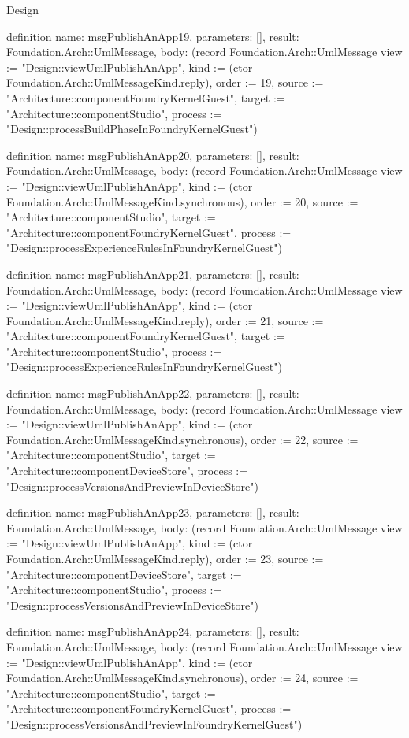 \begin{lexlean}{Design}
\begin{semanticmodule}
definition{
  name: msgPublishAnApp19,
  parameters: [],
  result: Foundation.Arch::UmlMessage,
  body: (record Foundation.Arch::UmlMessage {view := "Design::viewUmlPublishAnApp", kind := (ctor Foundation.Arch::UmlMessageKind.reply), order := 19, source := "Architecture::componentFoundryKernelGuest", target := "Architecture::componentStudio", process := "Design::processBuildPhaseInFoundryKernelGuest"})
}

definition{
  name: msgPublishAnApp20,
  parameters: [],
  result: Foundation.Arch::UmlMessage,
  body: (record Foundation.Arch::UmlMessage {view := "Design::viewUmlPublishAnApp", kind := (ctor Foundation.Arch::UmlMessageKind.synchronous), order := 20, source := "Architecture::componentStudio", target := "Architecture::componentFoundryKernelGuest", process := "Design::processExperienceRulesInFoundryKernelGuest"})
}

definition{
  name: msgPublishAnApp21,
  parameters: [],
  result: Foundation.Arch::UmlMessage,
  body: (record Foundation.Arch::UmlMessage {view := "Design::viewUmlPublishAnApp", kind := (ctor Foundation.Arch::UmlMessageKind.reply), order := 21, source := "Architecture::componentFoundryKernelGuest", target := "Architecture::componentStudio", process := "Design::processExperienceRulesInFoundryKernelGuest"})
}

definition{
  name: msgPublishAnApp22,
  parameters: [],
  result: Foundation.Arch::UmlMessage,
  body: (record Foundation.Arch::UmlMessage {view := "Design::viewUmlPublishAnApp", kind := (ctor Foundation.Arch::UmlMessageKind.synchronous), order := 22, source := "Architecture::componentStudio", target := "Architecture::componentDeviceStore", process := "Design::processVersionsAndPreviewInDeviceStore"})
}

definition{
  name: msgPublishAnApp23,
  parameters: [],
  result: Foundation.Arch::UmlMessage,
  body: (record Foundation.Arch::UmlMessage {view := "Design::viewUmlPublishAnApp", kind := (ctor Foundation.Arch::UmlMessageKind.reply), order := 23, source := "Architecture::componentDeviceStore", target := "Architecture::componentStudio", process := "Design::processVersionsAndPreviewInDeviceStore"})
}

definition{
  name: msgPublishAnApp24,
  parameters: [],
  result: Foundation.Arch::UmlMessage,
  body: (record Foundation.Arch::UmlMessage {view := "Design::viewUmlPublishAnApp", kind := (ctor Foundation.Arch::UmlMessageKind.synchronous), order := 24, source := "Architecture::componentStudio", target := "Architecture::componentFoundryKernelGuest", process := "Design::processVersionsAndPreviewInFoundryKernelGuest"})
}


\end{semanticmodule}
\end{lexlean}
